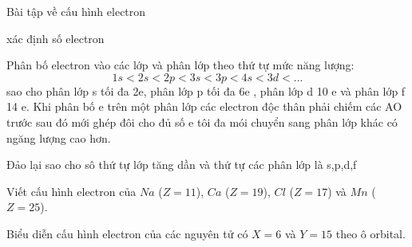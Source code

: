 \begin{dang}{Bài tập về cấu hình electron}\end{dang}
\begin{pp}
	\begin{cacbuoc}
		\item xác định số electron
		\item Phân bố electron vào các lớp và phân lớp theo thứ tự mức năng lượng:
		\[1s<2s<2p<3s<3p<4s<3d<...\] sao cho phân lớp s tối đa 2e, phân lớp p tối đa 6e , phân lớp d 10 e và phân lớp f 14 e. Khi phân bố e trên một phân lớp các electron độc thân phải chiếm các AO trước sau đó mới ghép đôi cho đủ số e tôi đa mói chuyển sang phân lớp khác có ngăng lượng cao hơn.
		\item Đảo lại  sao cho sô thứ tự lớp tăng dần và thứ tự các phân lớp là s,p,d,f
	\end{cacbuoc}
\end{pp}
\hienthiloigiaivd
\begin{vdex}
	Viết cấu hình electron của $Na$ ($Z=11$), $Ca$ ($Z=19$), $Cl$ ($Z=17$) và $Mn$ ($Z=25$).
\end{vdex}
\begin{vdex}
	Biểu diễn cấu hình electron của các nguyên tử có $X=6$ và $Y=15$ theo ô orbital.
\end{vdex}
